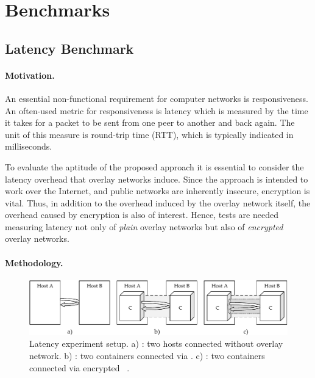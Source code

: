 \section{Benchmarks}

\subsection{Latency Benchmark} \label{sec:plainlatency}

\paragraph{Motivation.} An essential non-functional requirement for computer networks is responsiveness. An often-used metric for responsiveness is latency which is measured by the time it takes for a packet to be sent from one peer to another and back again. The unit of this measure is round-trip time (RTT), which is typically indicated in milliseconds. 

To evaluate the aptitude of the proposed approach it is essential to consider the latency overhead that overlay networks induce. Since the approach is intended to work over the Internet, and public networks are inherently insecure, encryption is vital. Thus, in addition to the overhead induced by the overlay network itself, the overhead caused by encryption is also of interest. Hence, tests are needed measuring latency not only of \emph{plain} overlay networks but also of \emph{encrypted} overlay networks.


\paragraph{Methodology.} 

\begin{figure}[htpb]
  \centering
  \includegraphics[width=\textwidth]{figures/ping-test}
  \caption[Latency experiment setup]{Latency experiment setup. a) : two hosts connected without overlay network. b) : two containers connected via \wnet . c) : two containers connected via encrypted \wnet\ .}\label{fig:latency-setup}
\end{figure}

